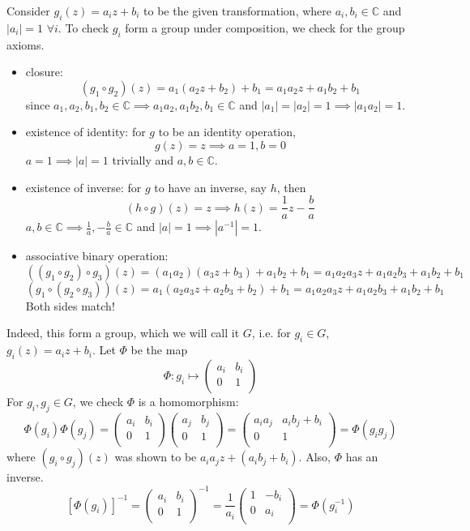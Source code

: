 \documentclass[a4paper]{article}
\begin{document}
\begin{ans}
Consider $g_i(z)=a_iz+b_i$ to be the given transformation, where $a_i,b_i\in\mathbb{C}$ and $|a_i|=1$ $\forall i$. To check $g_i$ form a group under composition, we check for the group axioms.
\begin{itemize}
    \item closure: 
    $$(g_1\circ g_2)(z)=a_1(a_2z+b_2)+b_1=a_1a_2z+a_1b_2+b_1$$
    since $a_1,a_2,b_1,b_2\in\mathbb{C}\implies a_1a_2,a_1b_2,b_1\in\mathbb{C}$ and $|a_1|=|a_2|=1\implies|a_1a_2|=1$.
    \item existence of identity: for $g$ to be an identity operation,
    $$g(z)=z\implies a=1,b=0$$
    $a=1\implies|a|=1$ trivially and $a,b\in\mathbb{C}$.
    \item existence of inverse: for $g$ to have an inverse, say $h$, then
    $$(h\circ g)(z)=z\implies h(z)=\frac{1}{a}z-\frac{b}{a}$$
    $a,b\in\mathbb{C}\implies\frac{1}{a},-\frac{b}{a}\in\mathbb{C}$ and $|a|=1\implies|a^{-1}|=1$.
    \item associative binary operation:
    $$((g_1\circ g_2)\circ g_3)(z)=(a_1a_2)(a_3z+b_3)+a_1b_2+b_1=a_1a_2a_3z+a_1a_2b_3+a_1b_2+b_1$$
    $$(g_1\circ(g_2\circ g_3))(z)=a_1(a_2a_3z+a_2b_3+b_2)+b_1=a_1a_2a_3z+a_1a_2b_3+a_1b_2+b_1$$
    Both sides match!
\end{itemize}
Indeed, this form a group, which we will call it $G$, i.e. for $g_i\in G$, $g_i(z)=a_iz+b_i$. Let $\Phi$ be the map
$$\Phi: g_i\mapsto\begin{pmatrix}a_i&b_i\\0&1\\\end{pmatrix}$$
For $g_i,g_j\in G$, we check $\Phi$ is a homomorphism:
$$\Phi(g_i)\Phi(g_j)=\begin{pmatrix}a_i&b_i\\0&1\\\end{pmatrix}\begin{pmatrix}a_j&b_j\\0&1\\\end{pmatrix}
=\begin{pmatrix}a_ia_j&a_ib_j+b_i\\0&1\\\end{pmatrix}=\Phi(g_ig_j)$$
where $(g_i\circ g_j)(z)$ was shown to be $a_ia_jz+(a_ib_j+b_i)$. Also, $\Phi$ has an inverse.
$$[\Phi(g_i)]^{-1}=\begin{pmatrix}a_i&b_i\\0&1\\\end{pmatrix}^{-1}=\frac{1}{a_i}\begin{pmatrix}1&-b_i\\0&a_i\\\end{pmatrix}=\Phi(g_i^{-1})$$

\end{ans}
\end{document}
